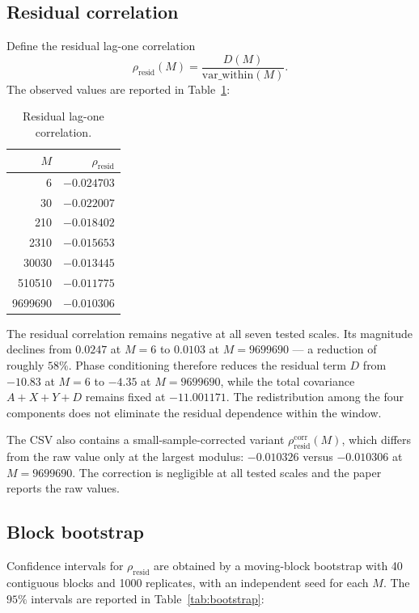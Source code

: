 \subsection{Residual correlation}

Define the residual lag-one correlation
\[
\rho_{\text{resid}}(M) = \frac{D(M)}{\text{var\_within}(M)}.
\]
The observed values are reported in Table~\ref{tab:rho-resid}:

\begin{table}[ht]
\centering
\caption{Residual lag-one correlation.}
\label{tab:rho-resid}
\begin{tabular}{rr}
\toprule
$M$ & $\rho_{\text{resid}}$ \\
\midrule
6 & $-0.024703$ \\
30 & $-0.022007$ \\
210 & $-0.018402$ \\
2310 & $-0.015653$ \\
30030 & $-0.013445$ \\
510510 & $-0.011775$ \\
9699690 & $-0.010306$ \\
\bottomrule
\end{tabular}
\end{table}

The residual correlation remains negative at all seven tested scales. Its magnitude declines from $0.0247$ at $M=6$ to $0.0103$ at $M=9699690$ --- a reduction of roughly $58\%$. Phase conditioning therefore reduces the residual term $D$ from $-10.83$ at $M=6$ to $-4.35$ at $M=9699690$, while the total covariance $A+X+Y+D$ remains fixed at $-11.001171$. The redistribution among the four components does not eliminate the residual dependence within the window.

The CSV also contains a small-sample-corrected variant $\rho_{\text{resid}}^{\text{corr}}(M)$, which differs from the raw value only at the largest modulus: $-0.010326$ versus $-0.010306$ at $M=9699690$. The correction is negligible at all tested scales and the paper reports the raw values.

\subsection{Block bootstrap}

Confidence intervals for $\rho_{\text{resid}}$ are obtained by a moving-block bootstrap with 40 contiguous blocks and 1000 replicates, with an independent seed for each $M$. The $95\%$ intervals are reported in Table~\ref{tab:bootstrap}:

